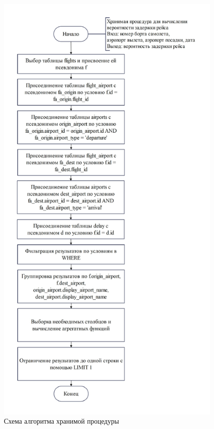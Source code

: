 \begin{figure}[H]
    \centering
    \includegraphics[scale=0.7]{inc/Drawing5}
    \caption{Схема алгоритма хранимой процедуры}
    \label{fig:procedure}
\end{figure}

